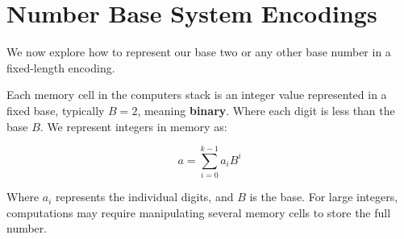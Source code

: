 \vspace{-2em}
\section{Number Base System Encodings}

\label{sec:base_encodings}
 
\noindent
We now explore how to represent our base two or any other base number in a fixed-length encoding.


    

\begin{Def}

    \label{def:number_base_fixed_length_encoding}

    \noindent
    Each memory cell in the computers stack is an integer value represented in a fixed base, typically \(B = 2\), 
    meaning \textbf{binary}. Where each digit is less than the base \(B\). We represent integers in memory as:

    \[
    a = \sum_{i=0}^{k-1} a_i B^i
    \]
    
    \noindent
    Where \( a_i \) represents the individual digits, and \(B\) is the base. For large integers, computations may require manipulating several memory cells to store the full number.
\end{Def}

